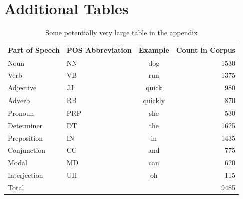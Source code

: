\documentclass[../CLthesis.tex]{subfiles}
\begin{document}
\chapter{Additional Tables}%
\label{appendix:tables}

\begin{table}[htbp]
	\centering
	\begin{tabular}{llcr}
		\toprule
		Part of Speech & POS Abbreviation & Example & Count in Corpus \\
		\midrule
		Noun           & NN               & dog     & 1530           \\
		Verb           & VB               & run     & 1375           \\
		Adjective      & JJ               & quick   & 980            \\
		Adverb         & RB               & quickly & 870            \\
		Pronoun        & PRP              & she     & 530            \\
		Determiner     & DT               & the     & 1625           \\
		Preposition    & IN               & in      & 1435           \\
		Conjunction    & CC               & and     & 775            \\
		Modal          & MD               & can     & 620            \\
		Interjection   & UH               & oh      & 115            \\
		\midrule
		Total          &                  &         & 9485           \\
		\bottomrule
	\end{tabular}
	

	\caption[An Additional Table]{Some potentially very large table in the appendix}%
	\label{tab:appendix_postags}
\end{table}
\end{document}
